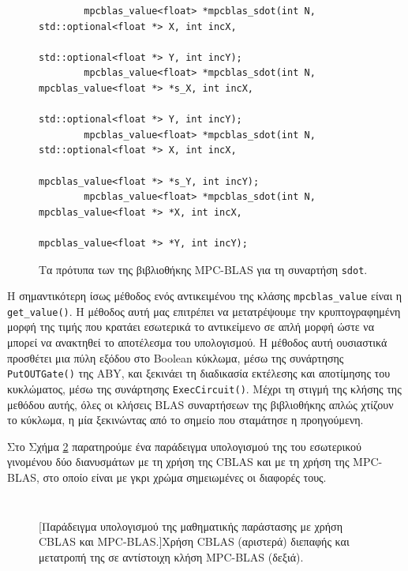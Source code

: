 \begin{figure}[h!]
    \begin{center}
        \begin{verbatim}
        mpcblas_value<float> *mpcblas_sdot(int N, std::optional<float *> X, int incX,
                                                std::optional<float *> Y, int incY);
        mpcblas_value<float> *mpcblas_sdot(int N, mpcblas_value<float *> *s_X, int incX,
                                                std::optional<float *> Y, int incY);
        mpcblas_value<float> *mpcblas_sdot(int N, std::optional<float *> X, int incX,
                                                mpcblas_value<float *> *s_Y, int incY);
        mpcblas_value<float> *mpcblas_sdot(int N, mpcblas_value<float *> *X, int incX,
                                                mpcblas_value<float *> *Y, int incY);
        \end{verbatim}
    \end{center}
    \caption{Τα πρότυπα των της βιβλιοθήκης MPC-BLAS για τη συναρτήση \texttt{sdot}.}
    \label{code:mpcblas-sdot}
\end{figure}

Η σημαντικότερη ίσως μέθοδος ενός αντικειμένου της κλάσης \texttt{mpcblas_value} είναι η \texttt{get_value()}. Η μέθοδος αυτή μας επιτρέπει να μετατρέψουμε την κρυπτογραφημένη μορφή της τιμής που κρατάει εσωτερικά το αντικείμενο σε απλή μορφή ώστε να μπορεί να ανακτηθεί το αποτέλεσμα του υπολογισμού. Η μέθοδος αυτή ουσιαστικά προσθέτει μια πύλη εξόδου στο Boolean κύκλωμα, μέσω της συνάρτησης \texttt{PutOUTGate()} της ABY, και ξεκινάει τη διαδικασία εκτέλεσης και αποτίμησης του κυκλώματος, μέσω της συνάρτησης \texttt{ExecCircuit()}. Μέχρι τη στιγμή της κλήσης της μεθόδου αυτής, όλες οι κλήσεις BLAS συναρτήσεων της βιβλιοθήκης απλώς χτίζουν το κύκλωμα, η μία ξεκινώντας από το σημείο που σταμάτησε η προηγούμενη.

Στο Σχήμα \ref{code:mpc-blas-differences-1} παρατηρούμε ένα παράδειγμα υπολογισμού της του εσωτερικού γινομένου δύο διανυσμάτων με τη χρήση της CBLAS και με τη χρήση της MPC-BLAS, στο οποίο είναι με γκρι χρώμα σημειωμένες οι διαφορές τους.

\begin{figure}[htbp]
    \begin{minipage}{0.45\textwidth}
        \centering
        \inputminted[fontsize=\scriptsize,frame=single, linenos]{cpp}{./01_body/code/cblas-differences-1.cpp}
    \end{minipage}\hfill
    \begin{minipage}{0.45\textwidth}
        \centering
        \inputminted[fontsize=\scriptsize,frame=single, linenos, highlightlines={1,5,6,8},highlightcolor=lightgray]{cpp}{./01_body/code/mpc-blas-differences-1.cpp}
    \end{minipage}
    [Παράδειγμα υπολογισμού της μαθηματικής παράστασης με χρήση CBLAS και MPC-BLAS.]{Χρήση CBLAS (αριστερά) διεπαφής και μετατροπή της σε αντίστοιχη κλήση MPC-BLAS (δεξιά).}
    \label{code:mpc-blas-differences-1}
\end{figure}

